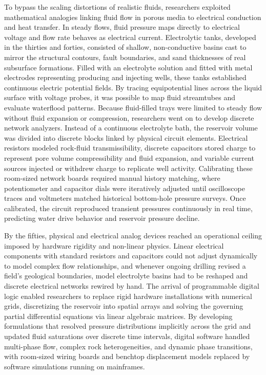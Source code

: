 To bypass the scaling distortions of realistic fluids, researchers exploited mathematical analogies linking fluid flow in porous media to electrical conduction and heat transfer. In steady flows, fluid pressure maps directly to electrical voltage and flow rate behaves as electrical current. Electrolytic tanks, developed in the thirties and forties, consisted of shallow, non-conductive basins cast to mirror the structural contours, fault boundaries, and sand thicknesses of real subsurface formations. Filled with an electrolyte solution and fitted with metal electrodes representing producing and injecting wells, these tanks established continuous electric potential fields. By tracing equipotential lines across the liquid surface with voltage probes, it was possible to map fluid streamtubes and evaluate waterflood patterns. Because fluid-filled trays were limited to steady flow without fluid expansion or compression, researchers went on to develop discrete network analyzers. Instead of a continuous electrolyte bath, the reservoir volume was divided into discrete blocks linked by physical circuit elements. Electrical resistors modeled rock-fluid transmissibility, discrete capacitors stored charge to represent pore volume compressibility and fluid expansion, and variable current sources injected or withdrew charge to replicate well activity. Calibrating these room-sized network boards required manual history matching, where potentiometer and capacitor dials were iteratively adjusted until oscilloscope traces and voltmeters matched historical bottom-hole pressure surveys. Once calibrated, the circuit reproduced transient pressures continuously in real time, predicting water drive behavior and reservoir pressure decline. \cite{muskatFlowHomogeneousFluids1937}

By the fifties, physical and electrical analog devices reached an operational ceiling imposed by hardware rigidity and non-linear physics. Linear electrical components with standard resistors and capacitors could not adjust dynamically to model complex flow relationships, and whenever ongoing drilling revised a field's geological boundaries, model electrolyte basins had to be reshaped and discrete electrical networks rewired by hand. The arrival of programmable digital logic enabled researchers to replace rigid hardware installations with numerical grids, discretizing the reservoir into spatial arrays and solving the governing partial differential equations via linear algebraic matrices. By developing formulations that resolved pressure distributions implicitly across the grid and updated fluid saturations over discrete time intervals, digital software handled multi-phase flow, complex rock heterogeneities, and dynamic phase transitions, with room-sized wiring boards and benchtop displacement models replaced by software simulations running on mainframes.

